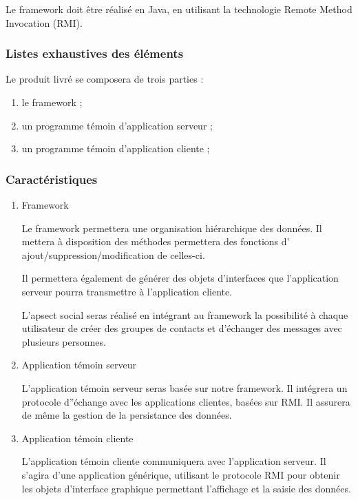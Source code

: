 Le framework doit être réalisé en Java, en utilisant la technologie Remote Method Invocation (RMI).

\subsubsection{Listes exhaustives des éléments} 
Le produit livré se composera de trois parties :
\begin{enumerate}
 \item le framework ;
 \item un programme témoin d'application serveur ;
 \item un programme témoin d'application cliente ;
\end{enumerate}

\subsubsection{Caractéristiques}
\begin{enumerate}
 \item Framework

Le framework permettera une organisation hiérarchique des données.
Il mettera à disposition des méthodes permettera des fonctions d' ajout/suppression/modification de celles-ci.

Il permettera également de générer des objets d'interfaces que l'application serveur pourra transmettre à l'application cliente.

L'apsect social seras réalisé en intégrant au framework la possibilité à chaque utilisateur de créer des groupes de contacts et d'échanger des messages avec plusieurs personnes.

 \item Application témoin serveur

L'application témoin serveur seras basée sur notre framework.
Il intégrera un protocole d''échange avec les applications clientes, basées sur RMI.
Il assurera de même la gestion de la persistance des données.

 \item Application témoin cliente

L'application témoin cliente communiquera avec l'application serveur.
Il s'agira d'une application générique, utilisant le protocole RMI pour obtenir les objets
d'interface graphique permettant l'affichage et la saisie des données.

\end{enumerate}
